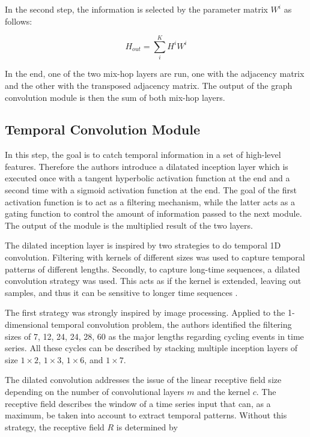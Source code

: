 \documentclass[letterpaper, twocolumn,11pt]{article}
\begin{document}
    In the second step, the information is selected by the parameter matrix $W^{i}$ as follows:

    \begin{equation}
        H_{out} =\sum_{i}^{K} H^i W^i  \label{eq:hop_selection}
    \end{equation}

    In the end, one of the two mix-hop layers are run, one with the adjacency matrix and the other with the transposed adjacency matrix.
    The output of the graph convolution module is then the sum of both mix-hop layers.

    \subsection{Temporal Convolution Module}
    In this step, the goal is to catch temporal information in a set of high-level features.
    Therefore the authors introduce a dilatated inception layer which is executed once with a tangent hyperbolic activation function at the end
    and a second time with a sigmoid activation function at the end.
    The goal of the first activation function is to act as a filtering mechanism, while the latter acts as a gating function
    to control the amount of information passed to the next module.
    The output of the module is the multiplied result of the two layers.

    The dilated inception layer is inspired by two strategies to do temporal 1D convolution.
Filtering with kernels of different sizes was used to capture temporal patterns of different lengths.
    Secondly, to capture long-time sequences, a dilated convolution strategy was used.
    This acts as if the kernel is extended, leaving out samples, and thus it can be sensitive to longer time sequences \cite{xi2018deep}.

    The first strategy was strongly inspired by image processing.
    Applied to the 1-dimensional temporal convolution problem, the authors identified the filtering sizes of 7, 12, 24, 24, 28, 60
    as the major lengths regarding cycling events in time series.
    All these cycles can be described by stacking multiple inception layers of size $1 \times 2$, $1 \times 3$, $1 \times 6$, and $1 \times 7$.

    The dilated convolution addresses the issue of the linear receptive field size depending on the number of convolutional layers $m$ and the kernel $c$.
    The receptive field describes the window of a time series input that can, as a maximum, be taken into account to extract temporal patterns.
    Without this strategy, the receptive field $R$ is determined by
\end{document}
